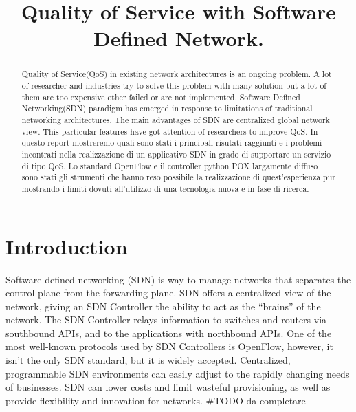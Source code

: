 \documentclass[conference,10pt]{IEEEtran}
\begin{document}
\title{Quality of Service with Software Defined Network.}

\author{
}

\maketitle

\begin{abstract}
Quality of Service(QoS) in existing network architectures is an ongoing problem.
A lot of researcher and industries try to solve this problem with many solution but a lot of them are too 
expensive other failed or are not implemented.
Software Defined Networking(SDN) paradigm has emerged in response to limitations of traditional networking architectures.
The main advantages of SDN are centralized global network view. This particular features have got attention of researchers to improve QoS.
In questo report mostreremo quali sono stati i principali risutati raggiunti e i problemi incontrati nella realizzazione di 
un applicativo SDN in grado di supportare un servizio di tipo QoS.
Lo standard OpenFlow e il controller python POX largamente diffuso sono stati gli strumenti che hanno reso possibile la
realizzazione di quest'esperienza pur mostrando i limiti dovuti all'utilizzo di una tecnologia nuova e in fase di ricerca.
\end{abstract}

\section{Introduction}\label{sec:intro}
Software-defined networking (SDN) is way to manage networks that separates the control plane from the forwarding plane. 
SDN offers a centralized view of the network, giving an SDN Controller the ability to act as the “brains” of the network. 
The SDN Controller relays information to switches and routers via southbound APIs, and to the applications with northbound APIs. 
One of the most well-known protocols used by SDN Controllers is OpenFlow, however, it isn’t the only SDN standard, but it is widely accepted.
Centralized, programmable SDN environments can easily adjust to the rapidly changing needs of businesses. SDN can lower costs and limit
wasteful provisioning, as well as provide flexibility and innovation for networks.
\#TODO da completare 
\end{document}

